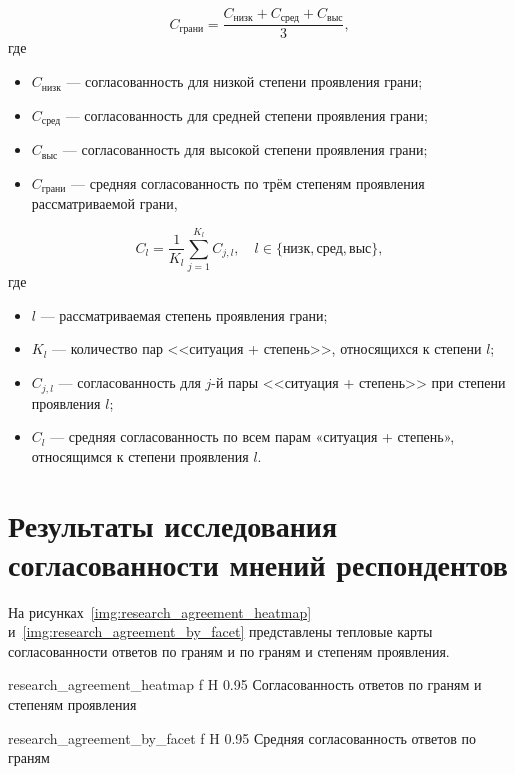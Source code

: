 	\begin{equation}
		\label{eq:research_facet_consensus}
		C_{\text{грани}} = \frac{C_{\text{низк}} + C_{\text{сред}} + C_{\text{выс}}}{3},
	\end{equation}
	где
	\begin{itemize}
		\item \(C_{\text{низк}}\) --- согласованность для низкой степени проявления грани;
		\item \(C_{\text{сред}}\) --- согласованность для средней степени проявления грани;
		\item \(C_{\text{выс}}\) --- согласованность для высокой степени проявления грани;
		\item \(C_{\text{грани}}\) --- средняя согласованность по трём степеням проявления рассматриваемой грани,
	\end{itemize}

	\begin{equation}
		\label{eq:research_level_consensus}
		C_l = \frac{1}{K_l} \sum_{j = 1}^{K_l} C_{j,l}, \quad l \in \{\text{низк}, \text{сред}, \text{выс}\},
	\end{equation}
	где
	\begin{itemize}
		\item \(l\) --- рассматриваемая степень проявления грани;
		\item \(K_l\) --- количество пар <<ситуация + степень>>, относящихся к степени \(l\);
		\item \(C_{j,l}\) --- согласованность для \(j\)-й пары <<ситуация + степень>> при степени проявления \(l\);
		\item \(C_l\) --- средняя согласованность по всем парам «ситуация + степень», относящимся к степени проявления \(l\).
	\end{itemize}

\section{Результаты исследования согласованности мнений респондентов}

На рисунках~\ref{img:research_agreement_heatmap} и~\ref{img:research_agreement_by_facet} представлены тепловые карты согласованности ответов по граням и по граням и степеням проявления.

{research_agreement_heatmap}
{f}
{H}
{0.95\textwidth}
{Согласованность ответов по граням и степеням проявления}

{research_agreement_by_facet}
{f}
{H}
{0.95\textwidth}
{Средняя согласованность ответов по граням}

